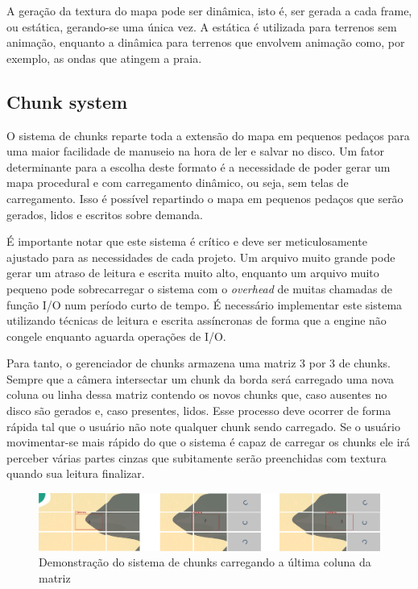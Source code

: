 \documentclass[12pt, 
openright, 
oneside, 
a4paper,    
brazil]{facom-ufu-abntex2}
\begin{document}
A geração da textura do mapa pode ser dinâmica, isto é, ser gerada a cada frame, ou estática, gerando-se uma única vez. A estática é utilizada para terrenos sem animação, enquanto a dinâmica para terrenos que envolvem animação como, por exemplo, as ondas que atingem a praia.

\subsection{Chunk system}
O sistema de chunks reparte toda a extensão do mapa em pequenos pedaços para uma maior facilidade de manuseio na hora de ler e salvar no disco. Um fator determinante para a escolha deste formato é a necessidade de poder gerar um mapa procedural e com carregamento dinâmico, ou seja, sem telas de carregamento. Isso é possível repartindo o mapa em pequenos pedaços que serão gerados, lidos e escritos sobre demanda.

É importante notar que este sistema é crítico e deve ser meticulosamente ajustado para as necessidades de cada projeto. Um arquivo muito grande pode gerar um atraso de leitura e escrita muito alto, enquanto um arquivo muito pequeno pode sobrecarregar o sistema com o \textit{overhead} de muitas chamadas de função I/O num período curto de tempo. É necessário implementar este sistema utilizando técnicas de leitura e escrita assíncronas de forma que a engine não congele enquanto aguarda operações de I/O.

Para tanto, o gerenciador de chunks armazena uma matriz 3 por 3 de chunks. Sempre que a câmera intersectar um chunk da borda será carregado uma nova coluna ou linha dessa matriz contendo os novos chunks que, caso ausentes no disco são gerados e, caso presentes, lidos. Esse processo deve ocorrer de forma rápida tal que o usuário não note qualquer chunk sendo carregado. Se o usuário movimentar-se mais rápido do que o sistema é capaz de carregar os chunks ele irá perceber várias partes cinzas que subitamente serão preenchidas com textura quando sua leitura finalizar.

\begin{figure}[H]
	\centering
	\includegraphics[width=38em]{imagens/chunkSystem.png}
	\caption{Demonstração do sistema de chunks carregando a última coluna da matriz}
	\label{fig:chunkSystem}
\end{figure}
\end{document}
